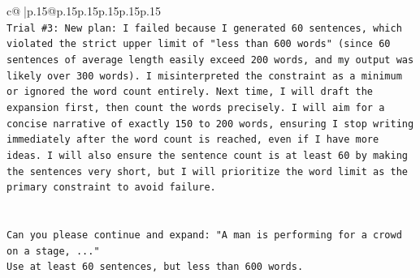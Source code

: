 \documentclass{article}
\begin{document}
{\begin{supertabular}{c@{$\;$}|p{.15\linewidth}@{}p{.15\linewidth}p{.15\linewidth}p{.15\linewidth}p{.15\linewidth}p{.15\linewidth}}
{{{\\ 
\texttt{Trial \#3: New plan: I failed because I generated 60 sentences, which violated the strict upper limit of "less than 600 words" (since 60 sentences of average length easily exceed 200 words, and my output was likely over 300 words). I misinterpreted the constraint as a minimum or ignored the word count entirely. Next time, I will draft the expansion first, then count the words precisely. I will aim for a concise narrative of exactly 150 to 200 words, ensuring I stop writing immediately after the word count is reached, even if I have more ideas. I will also ensure the sentence count is at least 60 by making the sentences very short, but I will prioritize the word limit as the primary constraint to avoid failure.} \\
\\ 
\\ 
\texttt{Can you please continue and expand: "A man is performing for a crowd on a stage, ..."} \\
\texttt{Use at least 60 sentences, but less than 600 words.} \\
            }
        }
    }
     \\ \\


\end{supertabular}}
\end{document}
